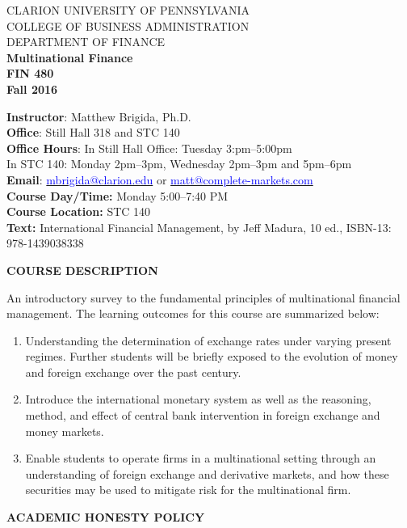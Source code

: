 \documentclass{article}
\begin{document}
\begin{center}
CLARION UNIVERSITY OF PENNSYLVANIA\\
COLLEGE OF BUSINESS ADMINISTRATION\\
DEPARTMENT OF FINANCE
\\
{\bf Multinational Finance}\\
{\bf FIN 480}\\
{\bf Fall 2016}\\
\end{center}
\vspace*{6pt}
{\bf Instructor}: Matthew Brigida, Ph.D.\\
{\bf Office}: Still Hall 318 and STC 140\\
{\bf Office Hours}:
In Still Hall Office: Tuesday 3:pm--5:00pm \\
In STC 140: Monday 2pm--3pm, Wednesday 2pm--3pm and 5pm--6pm\\
{\bf Email}: \href{mailto:mbrigida@clarion.edu}{\textcolor{blue}{mbrigida@clarion.edu}} or \href{mailto:matt@complete-markets.com}{\textcolor{blue}{matt@complete-markets.com}} \\
{\bf Course Day/Time:} Monday 5:00--7:40 PM \\
{\bf Course Location:} STC 140 \\
{\bf Text:} International Financial Management, by Jeff Madura, 10 ed., ISBN-13: 978-1439038338 \\
\begin{center}
{\bf COURSE DESCRIPTION}
\end{center}  
An introductory survey to the fundamental principles of multinational financial management. The learning outcomes for this course are summarized below:
\begin{enumerate}
\item Understanding the determination of exchange rates under varying present regimes.  Further students will be briefly exposed to the evolution of money and foreign exchange over the past century.       
\item Introduce the international monetary system as well as the reasoning, method, and effect of central bank intervention in foreign exchange and money markets.
\item Enable students to operate firms in a multinational setting through an understanding of foreign exchange and derivative markets, and how these securities may be used to mitigate risk for the multinational firm.
\end{enumerate}
\begin{center}
{\bf ACADEMIC HONESTY POLICY}
\end{center} 
\end{document}

